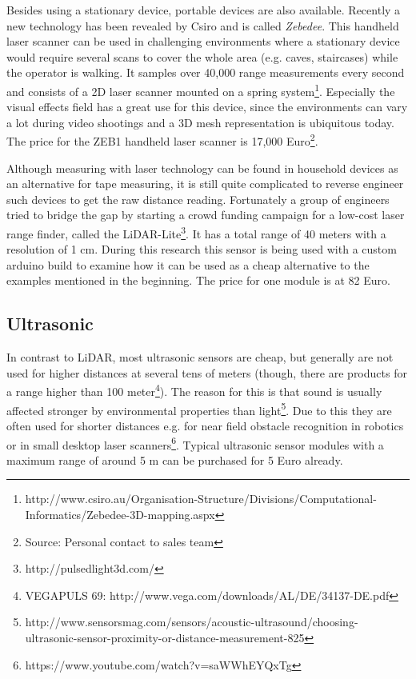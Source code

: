 Besides using a stationary device, portable devices are also available. Recently a new technology has been revealed by Csiro and is called \textit{Zebedee}. This handheld laser scanner can be used in challenging environments where a stationary device would require several scans to cover the whole area (e.g. caves, staircases) while the operator is walking. It samples over 40,000 range measurements every second and consists of a 2D laser scanner mounted on a spring system\footnote{http://www.csiro.au/Organisation-Structure/Divisions/Computational-Informatics/Zebedee-3D-mapping.aspx}. Especially the visual effects field has a great use for this device, since the environments can vary a lot during video shootings and a 3D mesh representation is ubiquitous today. The price for the ZEB1 handheld laser scanner is 17,000 Euro\footnote{Source: Personal contact to sales team}.

Although measuring with laser technology can be found in household devices as an alternative for tape measuring, it is still quite complicated to reverse engineer such devices to get the raw distance reading. Fortunately a group of engineers tried to bridge the gap by starting a crowd funding campaign for a low-cost laser range finder, called the LiDAR-Lite\footnote{http://pulsedlight3d.com/}. It has a total range of 40 meters with a resolution of 1 cm. During this research this sensor is being used with a custom arduino build to examine how it can be used as a cheap alternative to the examples mentioned in the beginning. The price for one module is at 82 Euro.

\subsection{Ultrasonic}

In contrast to LiDAR, most ultrasonic sensors are cheap, but generally are not used for higher distances at several tens of meters (though, there are products for a range higher than 100 meter\footnote{VEGAPULS 69: http://www.vega.com/downloads/AL/DE/34137-DE.pdf}). The reason for this is that sound is usually affected stronger by environmental properties than light\footnote{http://www.sensorsmag.com/sensors/acoustic-ultrasound/choosing-ultrasonic-sensor-proximity-or-distance-measurement-825}. Due to this they are often used for shorter distances e.g. for near field obstacle recognition in robotics or in small desktop laser scanners\footnote{https://www.youtube.com/watch?v=saWWhEYQxTg}. Typical ultrasonic sensor modules with a maximum range of around 5 m can be purchased for 5 Euro already.



